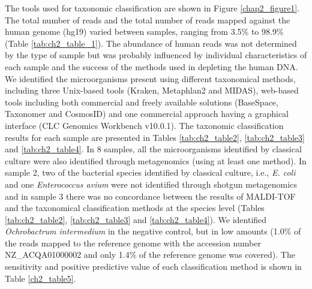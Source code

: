 The tools used for taxonomic classification are shown in Figure \ref{chap2_figure1}. 
The total number of reads and the total number of reads mapped against the human genome (hg19) varied between samples, ranging from 3.5\% to 98.9\% (Table \ref{tab:ch2_table_1}). 
The abundance of human reads was not determined by the type of sample but was probably influenced by individual characteristics of each sample and the success of the methods used in depleting the human DNA. 
We identified the microorganisms present using different taxonomical methods, including three Unix-based tools (Kraken, Metaphlan2 and MIDAS), web-based tools including both commercial and freely available solutions (BaseSpace, Taxonomer and CosmosID) and one commercial approach having a graphical interface (CLC Genomics Workbench v10.0.1). 
The taxonomic classification results for each sample are presented in Tables \ref{tab:ch2_table2}, \ref{tab:ch2_table3} and \ref{tab:ch2_table4}. 
In 8 samples, all the microorganisms identified by classical culture were also identified through metagenomics (using at least one method). 
In sample 2, two of the bacterial species identified by classical culture, i.e., \textit{E. coli} and one \textit{Enterococcus avium} were not identified through shotgun metagenomics and in sample 3 there was no concordance between the results of MALDI-TOF and the taxonomical classification methods at the species level (Tables \ref{tab:ch2_table2}, \ref{tab:ch2_table3} and \ref{tab:ch2_table4}).
We identified \textit{Ochrobactrum intermedium} in the negative control, but in low amounts (1.0\% of the reads mapped to the reference genome with the accession number NZ\_ACQA01000002 and only 1.4\% of the reference genome was covered). 
The sensitivity and positive predictive value of each classification method is shown in Table \ref{ch2_table5}.

